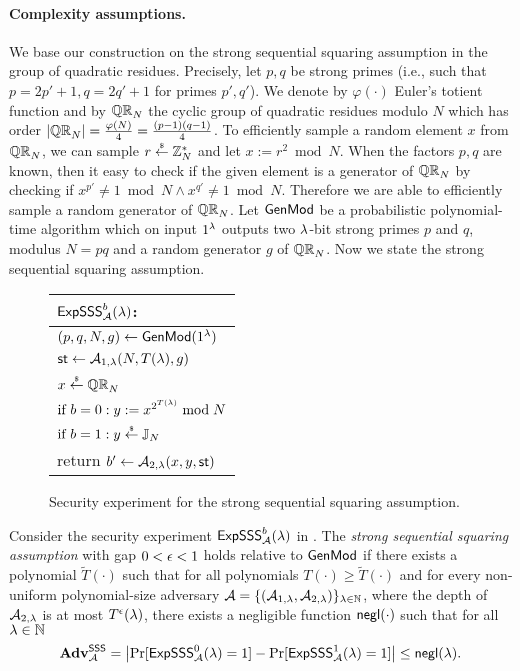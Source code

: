 \paragraph{Complexity assumptions.}
We base our construction on the strong sequential squaring assumption in the group of quadratic residues. Precisely, let $p, q$ be strong primes (i.e., such that $p = 2p'+1,  q= 2q'+1$ for primes $p', q'$). We denote by $\varphi(\cdot)$ Euler's totient function and by $\mathbb{QR}_N$ the cyclic group of quadratic residues modulo $N$ which has order $|\mathbb{QR}_N| = \frac{\varphi(N)}{4} = \frac{(p-1)(q-1)}{4}$. To efficiently sample a random element $x$ from $\mathbb{QR}_N$, we can sample $r \stackrel{{\scriptscriptstyle\$}}{\leftarrow} \mathbb{Z}_N^*$ and let $x:= r^2 \bmod N$. When the factors $p,q$ are known, then it easy to check if the given element is a generator of $\mathbb{QR}_N$ by checking if $x^{p'} \neq 1 \bmod N \land x^{q'} \neq 1 \bmod N$. Therefore we are able to efficiently sample a random generator of $\mathbb{QR}_N$. Let $\mathsf{GenMod}$ be a probabilistic polynomial-time algorithm which on input $1{^{\lambda}}$ outputs two $\lambda$-bit strong primes $p$ and $q$, modulus $N= pq$ and a random generator $g$ of $\mathbb{QR}_N$. Now we state the strong sequential squaring assumption. 


\begin{figure}[h]
\begin{center}
\begin{tabular}{l}
$\mathsf{ExpSSS}_{\mathcal{A}}^{b}(\lambda)$: \\
\hline
$(p, q, N,g) \leftarrow \mathsf{GenMod}(1{^{\lambda}})$ \\
$\mathsf{st} \leftarrow \mathcal{A}_{1, \lambda}(N, T(\lambda),g)$\\
$x \stackrel{{\scriptscriptstyle\$}}{\leftarrow} \mathbb{QR}_N$ \\
$\text{if } b = 0: y:=x^{2^{T(\lambda)}} \bmod N$\\
$\text{if } b = 1: y \stackrel{{\scriptscriptstyle\$}}{\leftarrow} \mathbb{J}_N$\\
return	$b' \leftarrow \mathcal{A}_{2,\lambda}(x, y, \mathsf{st})$
\end{tabular}
\end{center}
\caption{\label{fig:sss}Security experiment for the strong sequential squaring assumption.}
\end{figure}


\begin{definition}\label{def:sssa}
Consider the security experiment $\mathsf{ExpSSS}_{\mathcal{A}}^{b}(\lambda)$ in . The \emph{strong sequential squaring assumption} with gap $0< \epsilon <1$ holds relative to $\mathsf{GenMod}$ if there exists a polynomial $\tilde{T}(\cdot)$ such that for all polynomials $T(\cdot) \geq \tilde{T}(\cdot)$ and for every non-uniform polynomial-size adversary $\mathcal{A} = \{(\mathcal{A}_{1,\lambda}, \mathcal{A}_{2,\lambda})\}_{\lambda \in \mathbb{N}}$, where the depth of $\mathcal{A}_{2,\lambda}$ is at most $T^{\epsilon}(\lambda)$, there exists a negligible function $\mathsf{negl}(\cdot)$ such that for all $\lambda \in \mathbb{N}$ 
\[\mathbf{Adv}^\mathsf{SSS}_{\mathcal{A}} = \left| \Pr[\mathsf{ExpSSS}_{\mathcal{A}}^{0}(\lambda) = 1] - \Pr[\mathsf{ExpSSS}_{\mathcal{A}}^{1}(\lambda) = 1] \right| \leq \mathsf{negl}(\lambda).\]
\end{definition}

